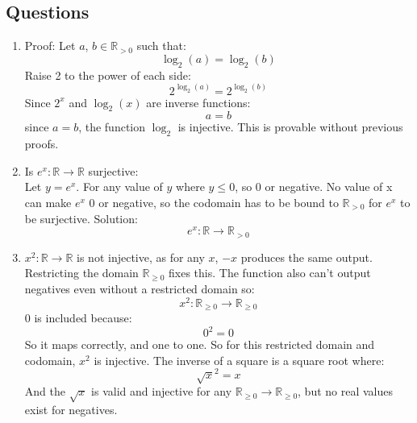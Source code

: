 \documentclass{article}
\begin{document}
\newpage
\subsection{Questions}
\begin{enumerate}
  \item Proof: Let $a$, $b \in \mathbb{R}_{>0}$ such that:
    \begin{equation}
      \log_{2}(a) = \log_{2}(b)
    \end{equation}
    Raise 2 to the power of each side:
    \begin{equation}
      2^{\log_{2}(a)} = 2^{\log_{2}(b)}
    \end{equation}
    Since $2^{x}$ and $\log_{2}(x)$ are inverse functions:
    \begin{equation}
      a = b
    \end{equation}
    since $a = b$, the function $\log_{2}$ is injective. This is provable without previous proofs.
  
  \setcounter{equation}{0}
  \item Is $e^{x} : \mathbb{R} \to \mathbb{R}$ surjective: \\
    Let $y = e^{x}$. For any value of $y$ where $y \le 0$, so 0 or negative. No value of x can make 
    $e^{x}$ 0 or negative, so the codomain has to be bound to $\mathbb{R}_{>0}$ for $e^{x}$ to be surjective.
    Solution: 
    \begin{equation}
      e^{x} : \mathbb{R} \to \mathbb{R}_{>0} 
    \end{equation}
    
    \setcounter{equation}{0}
  \item $x^{2} : \mathbb{R} \to \mathbb{R}$ is not injective, as for any $x$, $-x$ produces the same output.
    Restricting the domain $\mathbb{R}_{\ge 0}$ fixes this. The function also can't output negatives even without a restricted domain so:
    \begin{equation}
      x^{2} : \mathbb{R}_{\ge 0} \to \mathbb{R}_{\ge 0} 
    \end{equation}
    0 is included because:
    \begin{equation}
      0^{2} = 0 
    \end{equation}
    So it maps correctly, and one to one. So for this restricted domain and codomain, $x^{2}$ is injective. 
    The inverse of a square is a square root where:
    \begin{equation}
      \sqrt x^{2} = x
    \end{equation}
    And the $\sqrt x$ is valid and injective for any $\mathbb{R}_{\ge 0} \to \mathbb{R}_{\ge 0}$,
    but no real values exist for negatives.
  

\end{enumerate}
\end{document}
